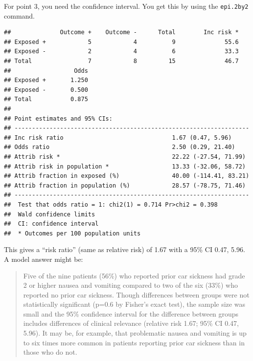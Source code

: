 \documentclass[]{book}
\newenvironment{Shaded}{\begin{snugshade}}{\end{snugshade}}
\newcommand{\DataTypeTok}[1]{\textcolor[rgb]{0.13,0.29,0.53}{#1}}
\newcommand{\DecValTok}[1]{\textcolor[rgb]{0.00,0.00,0.81}{#1}}
\newcommand{\KeywordTok}[1]{\textcolor[rgb]{0.13,0.29,0.53}{\textbf{#1}}}
\newcommand{\NormalTok}[1]{#1}
\newcommand{\OperatorTok}[1]{\textcolor[rgb]{0.81,0.36,0.00}{\textbf{#1}}}
\begin{document}
For point 3, you need the confidence interval. You get this by using the
\texttt{epi.2by2} command.

\begin{Shaded}
\end{Shaded}

\begin{verbatim}
##              Outcome +    Outcome -      Total        Inc risk *
## Exposed +            5            4          9              55.6
## Exposed -            2            4          6              33.3
## Total                7            8         15              46.7
##                  Odds
## Exposed +       1.250
## Exposed -       0.500
## Total           0.875
## 
## Point estimates and 95% CIs:
## -------------------------------------------------------------------
## Inc risk ratio                               1.67 (0.47, 5.96)
## Odds ratio                                   2.50 (0.29, 21.40)
## Attrib risk *                                22.22 (-27.54, 71.99)
## Attrib risk in population *                  13.33 (-32.06, 58.72)
## Attrib fraction in exposed (%)               40.00 (-114.41, 83.21)
## Attrib fraction in population (%)            28.57 (-78.75, 71.46)
## -------------------------------------------------------------------
##  Test that odds ratio = 1: chi2(1) = 0.714 Pr>chi2 = 0.398
##  Wald confidence limits
##  CI: confidence interval
##  * Outcomes per 100 population units
\end{verbatim}

This gives a ``risk ratio'' (same as relative risk) of 1.67 with a 95\%
CI 0.47, 5.96. A model answer might be:

\begin{quote}
Five of the nine patients (56\%) who reported prior car sickness had
grade 2 or higher nausea and vomiting compared to two of the six (33\%)
who reported no prior car sickness. Though differences between groups
were not statistically significant (p=0.6 by Fisher's exact test), the
sample size was small and the 95\% confidence interval for the
difference between groups includes differences of clinical relevance
(relative risk 1.67; 95\% CI 0.47, 5.96). It may be, for example, that
problematic nausea and vomiting is up to six times more common in
patients reporting prior car sickness than in those who do not.
\end{quote}
\end{document}

